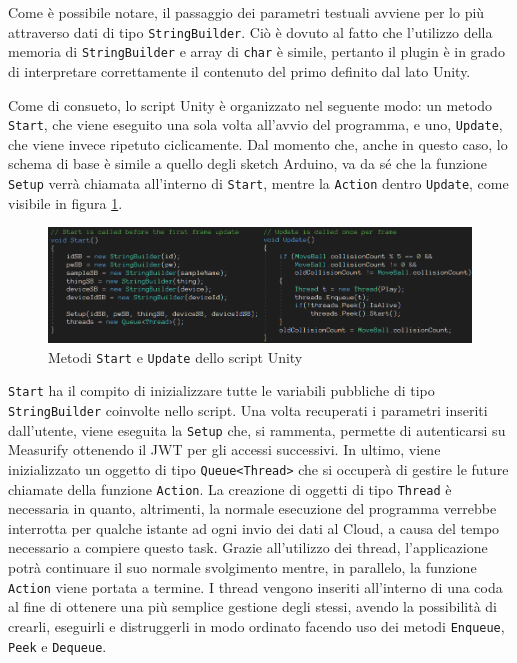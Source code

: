Come è possibile notare, il passaggio dei parametri testuali avviene per lo più attraverso dati di tipo \texttt{StringBuilder}. Ciò è dovuto al fatto che l’utilizzo della memoria di \texttt{StringBuilder} e array di \texttt{char} è simile, pertanto il plugin è in grado di interpretare correttamente il contenuto del primo definito dal lato Unity. 

Come di consueto, lo script Unity è organizzato nel seguente modo: un metodo \texttt{Start}, che viene eseguito una sola volta all’avvio del programma, e uno, \texttt{Update}, che viene invece ripetuto ciclicamente. Dal momento che, anche in questo caso, lo schema di base è simile a quello degli sketch Arduino, va da sé che la funzione \texttt{Setup} verrà chiamata all'interno di \texttt{Start}, mentre la \texttt{Action} dentro \texttt{Update}, come visibile in figura \ref{startupdate}. 

\begin{figure}[H]
	\centering
	\includegraphics[width=\linewidth]{pics/startupdate}
	\caption{Metodi \texttt{Start} e \texttt{Update} dello script Unity}
	\label{startupdate}
\end{figure}

\texttt{Start} ha il compito di inizializzare tutte le variabili pubbliche di tipo \texttt{StringBuilder} coinvolte nello script. Una volta recuperati i parametri inseriti dall'utente, viene eseguita la \texttt{Setup} che, si rammenta, permette di autenticarsi su Measurify ottenendo il JWT per gli accessi successivi. In ultimo, viene inizializzato un oggetto di tipo \texttt{Queue<Thread>} che si occuperà di gestire le future chiamate della funzione \texttt{Action}. La creazione di oggetti di tipo \texttt{Thread} è necessaria in quanto, altrimenti, la normale esecuzione del programma verrebbe interrotta per qualche istante ad ogni invio dei dati al Cloud, a causa del tempo necessario a compiere questo task. Grazie all'utilizzo dei thread, l'applicazione potrà continuare il suo normale svolgimento mentre, in parallelo, la funzione \texttt{Action} viene portata a termine. I thread vengono inseriti all'interno di una coda al fine di ottenere una più semplice gestione degli stessi, avendo la possibilità di crearli, eseguirli e distruggerli in modo ordinato facendo uso dei metodi \texttt{Enqueue}, \texttt{Peek} e \texttt{Dequeue}.

